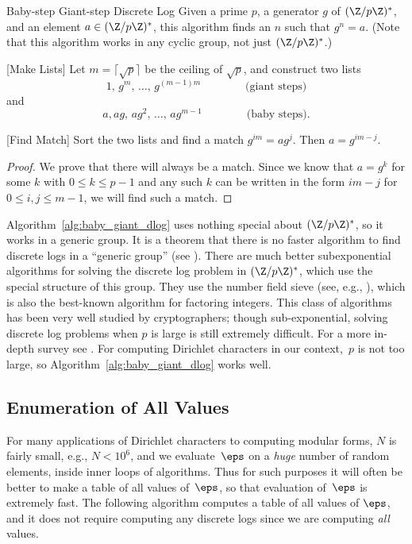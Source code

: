 \begin{algorithm}{Baby-step Giant-step Discrete Log}
\label{alg:baby_giant_dlog}
Given a prime $p$, a generator $g$ of $(\Z/p\Z)^*$,
and an element $a\in (\Z/p\Z)^*$, this algorithm
finds an $n$ such that $g^n=a$.  
(Note that this algorithm works in any cyclic group,
not just $(\Z/p\Z)^*$.)
\begin{steps}
\item{}[Make Lists] 
Let $m=\lceil{} \sqrt{p}\rceil{}$ be the ceiling of $\sqrt{p}$,
and
construct two lists $$
1,\, g^m,\, \ldots, \,g^{(m-1)m}
\qquad\qquad\text{(giant steps)} $$
and 
$$
a, ag,\, ag^2,\, \ldots, \,
ag^{m-1}\qquad\qquad\text{(baby steps)}.
$$
\item{}[Find Match]\label{step:find_match}
Sort the two lists and
find a match $g^{im} = a g^j$. Then $a = g^{im-j}$.
\end{steps}
\end{algorithm}
\begin{proof}
  We prove that there will always be a match. Since we know that $a=g^k$ for some $k$
  with $0\leq k\leq p-1$ and any such $k$ can be written in the form
  $im-j$ for $0\leq i,j\leq m-1$, we will find such a match.
\end{proof}

Algorithm~\ref{alg:baby_giant_dlog} uses nothing special about
$(\Z/p\Z)^*$, so it works in a generic group.  It is a theorem that
there is no faster algorithm to find discrete logs in a ``generic
group'' (see \cite{shoup:lower,nechaev:lower}).  There are
much better subexponential algorithms for solving the discrete log
problem in $(\Z/p\Z)^*$, which use the special structure of this
group.  They use the number field sieve (see, e.g.,
\cite{gordon:dlog}), which is also the best-known algorithm for
factoring integers.  This class of algorithms has been very well
studied by cryptographers; though sub-exponential, solving discrete
log problems when $p$ is large is still extremely difficult.  For a
more in-depth survey see \cite{gordon:dlp}. 
For computing Dirichlet characters in our context,~$p$ is not 
too large, so Algorithm~\ref{alg:baby_giant_dlog} works well.

\subsection{Enumeration of All Values}
For many applications of Dirichlet characters to computing modular
forms, $N$ is fairly small, e.g., $N<10^6$, and we 
evaluate~$\eps$ on a {\em huge} number of random elements, inside
inner loops of algorithms.  Thus for such purposes it will often be
better to make a table of all values of~$\eps$, so that evaluation
of~$\eps$ is extremely fast.  The following algorithm computes a table
of all values of $\eps$, and it does not require computing any
discrete logs since we are computing {\em all} values.

